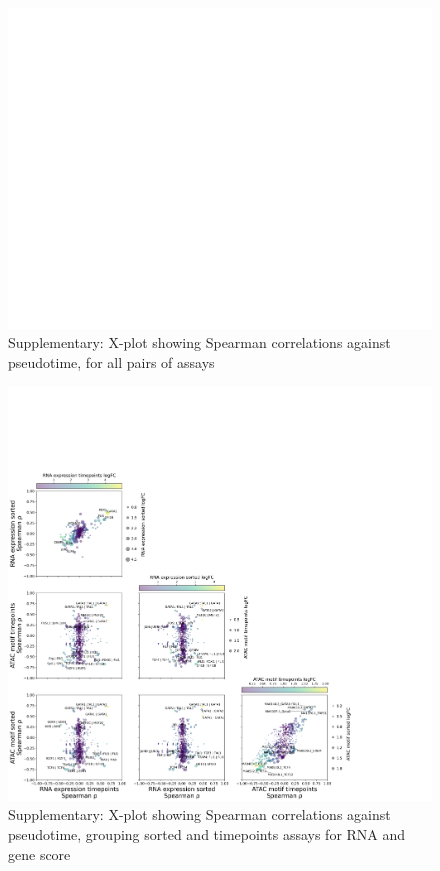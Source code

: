 \documentclass[a4paper]{article}
\begin{document}
\begin{figure}[!htb]
  \centering
  \includegraphics[width=\textwidth]{../figures/hematopoiesis/MKP_40_110_smooth_none_detailed_X_plot.png}
  \caption{Supplementary: X-plot showing Spearman correlations against pseudotime, for all pairs of assays}
\end{figure}

\begin{figure}[!htb]
  \centering
  \includegraphics[width=\textwidth]{../figures/hematopoiesis/MKP_40_110_smooth_none_semi_detailed_X_plot.png}
  \caption{Supplementary: X-plot showing Spearman correlations against pseudotime, grouping sorted and timepoints assays for RNA and gene score}
\end{figure}
\end{document}
